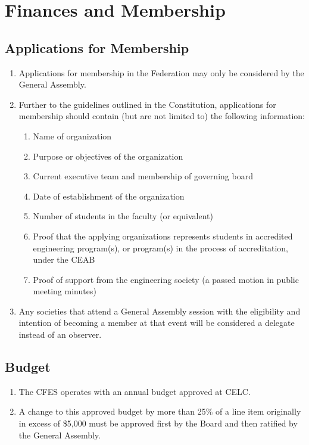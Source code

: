 \section{Finances and Membership}
\label{finances-and-membership}

\subsection{Applications for Membership}
\label{applications-for-membership}

\begin{enumerate}
 \item
  Applications for membership in the Federation may only be considered by the General Assembly.
 \item
  Further to the guidelines outlined in the Constitution, applications for membership should contain (but are not limited to) the following information:

  \begin{enumerate}
   \item
    Name of organization
   \item
    Purpose or objectives of the organization
   \item
    Current executive team and membership of governing board
   \item
    Date of establishment of the organization
   \item
    Number of students in the faculty (or equivalent)
   \item
    Proof that the applying organizations represents students in accredited engineering program(s), or program(s) in the process of accreditation, under the CEAB
   \item
    Proof of support from the engineering society (a passed motion in public meeting minutes)
  \end{enumerate}

 \item
  Any societies that attend a General Assembly session with the eligibility and intention of becoming a member at that event will be considered a delegate instead of an observer.
\end{enumerate}

\subsection{Budget}
\label{budget}

\begin{enumerate}
 \item
  The CFES operates with an annual budget approved at CELC.
 \item
  A change to this approved budget by more than 25\% of a line item originally in excess of \$5,000 must be approved first by the Board and then ratified by the General Assembly.
\end{enumerate}

